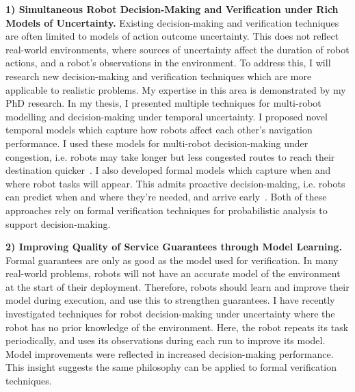 \documentclass[12pt]{article}
\begin{document}
\vspace*{1ex}\noindent\textbf{1) Simultaneous Robot Decision-Making and Verification under Rich Models of Uncertainty.} Existing decision-making and verification techniques are often limited to models of action outcome uncertainty.
%
This does not reflect real-world environments, where sources of uncertainty affect the duration of robot actions, and a robot's observations in the environment.
%
To address this, I will research new decision-making and verification techniques which are more applicable to realistic problems.
%
My expertise in this area is demonstrated by my PhD research.
%
In my thesis, I presented multiple techniques for multi-robot modelling and decision-making under temporal uncertainty.
%
I proposed novel temporal models which capture how robots affect each other's navigation performance.
%
I used these models for multi-robot decision-making under congestion, i.e. robots may take longer but less congested routes to reach their destination quicker~\cite{street2020multi,street2021congestion}.
%
I also developed formal models which capture when and where robot tasks will appear.
%
This admits proactive decision-making, i.e. robots can predict when and where they're needed, and arrive early~\cite{street2024right}.
%
Both of these approaches rely on formal verification techniques for probabilistic analysis to support decision-making.

\vspace*{1ex}\noindent\textbf{2) Improving Quality of Service Guarantees through Model Learning.} Formal guarantees are only as good as the model used for verification.
%
In many real-world problems, robots will not have an accurate model of the environment at the start of their deployment.
%
Therefore, robots should learn and improve their model during execution, and use this to strengthen guarantees.
%
I have recently investigated techniques for robot decision-making under uncertainty where the robot has no prior knowledge of the environment.
%
Here, the robot repeats its task periodically, and uses its observations during each run to improve its model.
%
Model improvements were reflected in increased decision-making performance.
%
This insight suggests the same philosophy can be applied to formal verification techniques.
\end{document}
